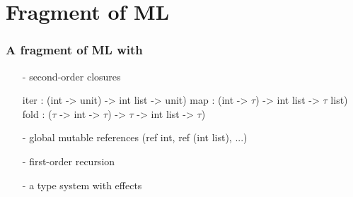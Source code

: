\documentclass[xcolor=dvipsnames]{beamer}
\begin{document}

\section*{Fragment of ML}
\begin{frame}[fragile]
\frametitle{A fragment of ML with}
 \pause
\begin{itemize}
	\item[-] {\red second-order} closures  
	\begin{footnotesize}
	\begin{whycode}
      iter : (int -> unit) -> int list -> unit)
      map  : (int -> $\tau$) -> int list -> $\tau$ list)
      fold : ($\tau$ -> int -> $\tau$) -> $\tau$ -> int list -> $\tau$) \end{whycode}
	\end{footnotesize}	\pause
	\item[-] global {\red mutable} references ({\blue ref} int, {\blue ref} (int list), ...) \pause
	\item[-] {\red first-order} recursion  \pause
	\item[-] a type system {\red with effects}
\end{itemize}
\end{frame}
\end{document}
